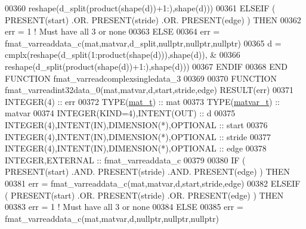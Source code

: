 \begin{DoxyCode}
00360                   reshape(d\_split(product(shape(d))+1:),shape(d)))
00361     \textcolor{keywordflow}{ELSEIF} ( \textcolor{keyword}{PRESENT}(start) .OR. \textcolor{keyword}{PRESENT}(stride) .OR. \textcolor{keyword}{PRESENT}(edge) ) \textcolor{keywordflow}{THEN}
00362         err = 1    \textcolor{comment}{! Must have all 3 or none}
00363     \textcolor{keywordflow}{ELSE}
00364         err = fmat\_varreaddata\_c(mat,matvar,d\_split,nullptr,nullptr,nullptr)
00365         d = cmplx(reshape(d\_split(1:product(shape(d))),shape(d)),         &
00366                   reshape(d\_split(product(shape(d))+1:),shape(d)))
00367 \textcolor{keywordflow}{    ENDIF}
00368 \textcolor{keyword}{END FUNCTION }fmat\_varreadcomplexsingledata\_3
00369 
00370 \textcolor{keyword}{FUNCTION }fmat\_varreadint32data\_0(mat,matvar,d,start,stride,edge) \textcolor{keyword}{RESULT}(err)
00371     \textcolor{keywordtype}{INTEGER(4)}                                  :: err
00372     \textcolor{keywordtype}{TYPE}(\hyperlink{group___m_a_t_gab0fc888f5a5d79943b16284b1f91c2e8}{mat\_t})                                 :: mat
00373     \textcolor{keywordtype}{TYPE}(\hyperlink{group___m_a_t_structmatvar__t}{matvar\_t})                              :: matvar
00374     \textcolor{keywordtype}{INTEGER(KIND=4)},\textcolor{keywordtype}{INTENT(OUT)}                 :: d
00375     \textcolor{keywordtype}{INTEGER(4)},\textcolor{keywordtype}{INTENT(IN)},\textcolor{keywordtype}{DIMENSION(*)},\textcolor{keywordtype}{OPTIONAL} :: start
00376     \textcolor{keywordtype}{INTEGER(4)},\textcolor{keywordtype}{INTENT(IN)},\textcolor{keywordtype}{DIMENSION(*)},\textcolor{keywordtype}{OPTIONAL} :: stride
00377     \textcolor{keywordtype}{INTEGER(4)},\textcolor{keywordtype}{INTENT(IN)},\textcolor{keywordtype}{DIMENSION(*)},\textcolor{keywordtype}{OPTIONAL} :: edge
00378     \textcolor{keywordtype}{INTEGER},\textcolor{keywordtype}{EXTERNAL}                            :: fmat\_varreaddata\_c
00379 
00380     \textcolor{keywordflow}{IF} ( \textcolor{keyword}{PRESENT}(start) .AND. \textcolor{keyword}{PRESENT}(stride) .AND. \textcolor{keyword}{PRESENT}(edge) ) \textcolor{keywordflow}{THEN}
00381         err = fmat\_varreaddata\_c(mat,matvar,d,start,stride,edge)
00382     \textcolor{keywordflow}{ELSEIF} ( \textcolor{keyword}{PRESENT}(start) .OR. \textcolor{keyword}{PRESENT}(stride) .OR. \textcolor{keyword}{PRESENT}(edge) ) \textcolor{keywordflow}{THEN}
00383         err = 1    \textcolor{comment}{! Must have all 3 or none}
00384     \textcolor{keywordflow}{ELSE}
00385         err = fmat\_varreaddata\_c(mat,matvar,d,nullptr,nullptr,nullptr)

\end{DoxyCode}
